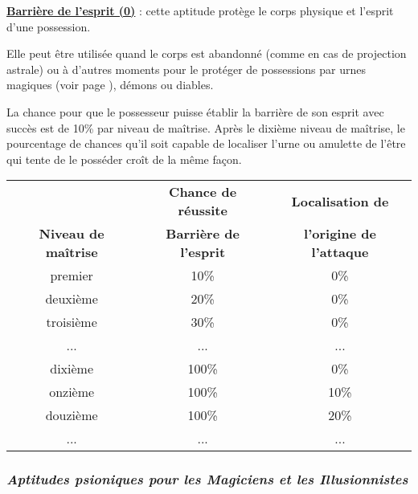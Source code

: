 \bigskip

\label{guerrier-barriere-esprit}\textbf{\uline{Barrière de l'esprit (0)}} : cette aptitude protège le corps physique et l'esprit d'une possession.

\bigskip

Elle peut être utilisée quand le corps est abandonné (comme en cas de projection astrale) ou à d'autres moments pour le protéger de possessions par urnes magiques (voir page \pageref{sort-urne-magique}), démons ou diables.

\bigskip

La chance pour que le possesseur puisse établir la barrière de son esprit avec succès est de 10\% par niveau de maîtrise. Après le dixième niveau de maîtrise, le pourcentage de chances qu'il soit capable de localiser l'urne ou amulette de l'être qui tente de le posséder croît de la même façon.

\bigskip

\begin{tabular}{ccc}
&\textbf{Chance de réussite} & \textbf{Localisation de} \\
\textbf{Niveau de maîtrise} & \textbf{Barrière de l'esprit} & \textbf{l'origine de l'attaque}\\
premier     & 10\%  & 0\% \\
deuxième    & 20\%  & 0\% \\
troisième   & 30\%  & 0\% \\
...         & ...   & ... \\
dixième     & 100\% & 0\% \\
onzième     & 100\% & 10\% \\
douzième    & 100\% & 20\% \\
...         & ...   & ... \\
\end{tabular}










\newpage
\subsubsection*{\textit{Aptitudes psioniques pour les Magiciens et les Illusionnistes}}


